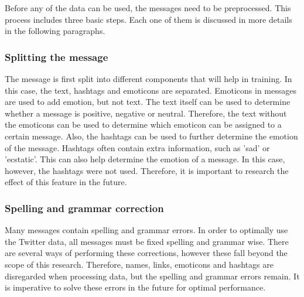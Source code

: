 
Before any of the data can be used, the messages need to be preprocessed. This process includes three basic steps. Each one of them is discussed in more details in the following paragraphs.

\subsubsection*{Splitting the message}
The message is first split into different components that will help in training. In this case, the text, hashtags and emoticons are separated. Emoticons in messages are used to add emotion, but not text. The text itself can be used to determine whether a message is positive, negative or neutral. Therefore, the text without the emoticons can be used to determine which emoticon can be assigned to a certain message. Also, the hashtags can be used to further determine the emotion of the message. Hashtags often contain extra information, such as 'sad' or 'ecstatic'. This can also help determine the emotion of a message. In this case, however, the hashtags were not used. Therefore, it is important to research the effect of this feature in the future. 

\subsubsection*{Spelling and grammar correction}
Many messages contain spelling and grammar errors. In order to optimally use the Twitter data, all messages must be fixed spelling and grammar wise. There are several ways of performing these corrections, however these fall beyond the scope of this research. Therefore, names, links, emoticons and hashtags are disregarded when processing data, but the spelling and grammar errors remain. It is imperative to solve these errors in the future for optimal performance.


